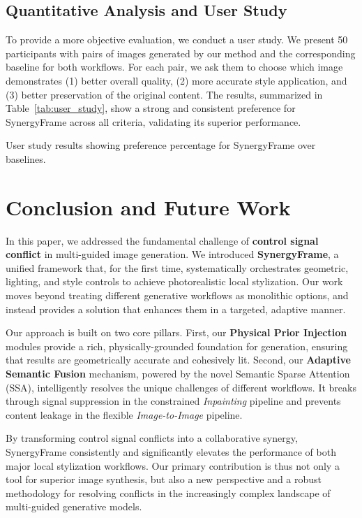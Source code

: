 \documentclass[letterpaper]{article} %
\begin{document}
\subsection{Quantitative Analysis and User Study}
To provide a more objective evaluation, we conduct a user study. We present 50 participants with pairs of images generated by our method and the corresponding baseline for both workflows. For each pair, we ask them to choose which image demonstrates (1) better overall quality, (2) more accurate style application, and (3) better preservation of the original content. The results, summarized in Table~\ref{tab:user_study}, show a strong and consistent preference for SynergyFrame across all criteria, validating its superior performance.

\begin{table}[h]
  \centering
  \caption{User study results showing preference percentage for SynergyFrame over baselines.}
  \label{tab:user_study}
\end{table}

\section{Conclusion and Future Work}
\label{sec:conclusion}

In this paper, we addressed the fundamental challenge of \textbf{control signal conflict} in multi-guided image generation. We introduced \textbf{SynergyFrame}, a unified framework that, for the first time, systematically orchestrates geometric, lighting, and style controls to achieve photorealistic local stylization. Our work moves beyond treating different generative workflows as monolithic options, and instead provides a solution that enhances them in a targeted, adaptive manner.

Our approach is built on two core pillars. First, our \textbf{Physical Prior Injection} modules provide a rich, physically-grounded foundation for generation, ensuring that results are geometrically accurate and cohesively lit. Second, our \textbf{Adaptive Semantic Fusion} mechanism, powered by the novel Semantic Sparse Attention (SSA), intelligently resolves the unique challenges of different workflows. It breaks through signal suppression in the constrained \textit{Inpainting} pipeline and prevents content leakage in the flexible \textit{Image-to-Image} pipeline.

By transforming control signal conflicts into a collaborative synergy, SynergyFrame consistently and significantly elevates the performance of both major local stylization workflows. Our primary contribution is thus not only a tool for superior image synthesis, but also a new perspective and a robust methodology for resolving conflicts in the increasingly complex landscape of multi-guided generative models.
\end{document}
